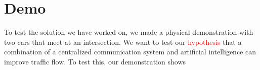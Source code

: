 \section{Demo}
To test the solution we have worked on, we made a physical demonstration with two cars that meet at an intersection. We want to test our \textcolor{red}{hypothesis} that a combination of a centralized communication system and artificial intelligence can improve traffic flow. To test this, our demonstration shows 